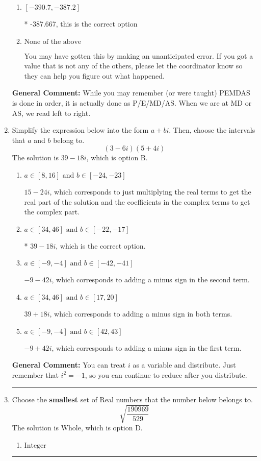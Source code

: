 \documentclass{extbook}[14pt]
\newcommand{\litem}[1]{\item #1

\rule{\textwidth}{0.4pt}}
\begin{document}
\begin{enumerate}
{\begin{enumerate}[label=\Alph*.]
 412.333, which corresponds to an Order of Operations error: multiplying by negative before squaring. For example: $(-3)^2 \neq -3^2$
\item \( [-390.7, -387.2] \)

* -387.667, this is the correct option
\item \( \text{None of the above} \)

 You may have gotten this by making an unanticipated error. If you got a value that is not any of the others, please let the coordinator know so they can help you figure out what happened.
\end{enumerate}

\textbf{General Comment:} While you may remember (or were taught) PEMDAS is done in order, it is actually done as P/E/MD/AS. When we are at MD or AS, we read left to right.
}
\litem{
Simplify the expression below into the form $a+bi$. Then, choose the intervals that $a$ and $b$ belong to.
\[ (3 - 6 i)(5 + 4 i) \]The solution is \( 39 - 18 i \), which is option B.\begin{enumerate}[label=\Alph*.]
\item \( a \in [8, 16] \text{ and } b \in [-24, -23] \)

 $15 - 24 i$, which corresponds to just multiplying the real terms to get the real part of the solution and the coefficients in the complex terms to get the complex part.
\item \( a \in [34, 46] \text{ and } b \in [-22, -17] \)

* $39 - 18 i$, which is the correct option.
\item \( a \in [-9, -4] \text{ and } b \in [-42, -41] \)

 $-9 - 42 i$, which corresponds to adding a minus sign in the second term.
\item \( a \in [34, 46] \text{ and } b \in [17, 20] \)

 $39 + 18 i$, which corresponds to adding a minus sign in both terms.
\item \( a \in [-9, -4] \text{ and } b \in [42, 43] \)

 $-9 + 42 i$, which corresponds to adding a minus sign in the first term.
\end{enumerate}

\textbf{General Comment:} You can treat $i$ as a variable and distribute. Just remember that $i^2=-1$, so you can continue to reduce after you distribute.
}
\litem{
Choose the \textbf{smallest} set of Real numbers that the number below belongs to.
\[ \sqrt{\frac{190969}{529}} \]The solution is \( \text{Whole} \), which is option D.\begin{enumerate}[label=\Alph*.]
\item \( \text{Integer} \)


\end{enumerate}}
\end{enumerate}
\end{document}

